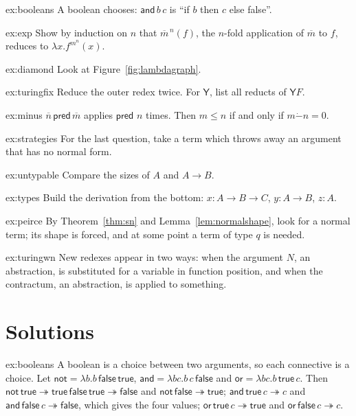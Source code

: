 \begin{hint}{ex:booleans}
A boolean chooses: $\mathsf{and}\,b\,c$ is ``if $b$ then $c$ else false''.
\end{hint}
\begin{hint}{ex:exp}
Show by induction on $n$ that $\overline m^{\,n}(f)$, the $n$-fold application of $\overline m$ to $f$, reduces to $\lambda x.f^{m^n}(x)$.
\end{hint}
\begin{hint}{ex:diamond}
Look at Figure~\ref{fig:lambdagraph}.
\end{hint}
\begin{hint}{ex:turingfix}
Reduce the outer redex twice. For $\mathsf Y$, list all reducts of $\mathsf YF$.
\end{hint}
\begin{hint}{ex:minus}
$\overline n\,\mathsf{pred}\,\overline m$ applies $\mathsf{pred}$ $n$ times. Then $m\le n$ if and only if $m\dot-n=0$.
\end{hint}
\begin{hint}{ex:strategies}
For the last question, take a term which throws away an argument that has no normal form.
\end{hint}
\begin{hint}{ex:untypable}
Compare the sizes of $A$ and $A\to B$.
\end{hint}
\begin{hint}{ex:types}
Build the derivation from the bottom: $x:A\to B\to C$, $y:A\to B$, $z:A$.
\end{hint}
\begin{hint}{ex:peirce}
By Theorem~\ref{thm:sn} and Lemma~\ref{lem:normalshape}, look for a normal term; its shape is forced, and at some point a term of type $q$ is needed.
\end{hint}
\begin{hint}{ex:turingwn}
New redexes appear in two ways: when the argument $N$, an abstraction, is substituted for a variable in function position, and when the contractum, an abstraction, is applied to something.
\end{hint}

\section{Solutions}

\begin{solution}{ex:booleans}
\idea A boolean is a choice between two arguments, so each connective is a choice.
\writeup Let $\mathsf{not}=\lambda b.b\,\mathsf{false}\,\mathsf{true}$, $\mathsf{and}=\lambda bc.b\,c\,\mathsf{false}$ and $\mathsf{or}=\lambda bc.b\,\mathsf{true}\,c$. Then $\mathsf{not}\,\mathsf{true}\twoheadrightarrow\mathsf{true}\,\mathsf{false}\,\mathsf{true}\twoheadrightarrow\mathsf{false}$ and $\mathsf{not}\,\mathsf{false}\twoheadrightarrow\mathsf{true}$; $\mathsf{and}\,\mathsf{true}\,c\twoheadrightarrow c$ and $\mathsf{and}\,\mathsf{false}\,c\twoheadrightarrow\mathsf{false}$, which gives the four values; $\mathsf{or}\,\mathsf{true}\,c\twoheadrightarrow\mathsf{true}$ and $\mathsf{or}\,\mathsf{false}\,c\twoheadrightarrow c$.
\end{solution}

